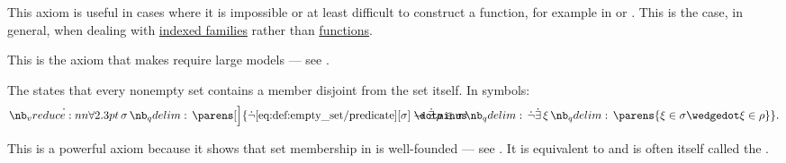 \begin{definition}
\begin{thmenum}
    This axiom is useful in cases where it is impossible or at least difficult to construct a function, for example in  or . This is the case, in general, when dealing with \hyperref[thm:zfc_existence_theorems/indexed_family]{indexed families} rather than \hyperref[def:function]{functions}.

    This is the axiom that makes  require large models --- see .

     The  states that every nonempty set contains a member disjoint from the set itself. In symbols:
    \begin{equation}\label{eq:def:zfc/foundation}
      \qforall \sigma \parens[\Big]
        {
          \synneg \ref{eq:def:empty_set/predicate}[\sigma]
          \synimplies
          \qexists {\rho \in \sigma} \synneg \qexists \xi \parens{ \xi \in \sigma \synwedge \xi \in \rho }
        }.
    \end{equation}

    This is a powerful axiom because it shows that set membership in  is well-founded --- see . It is equivalent to  and is often itself called the .
  \end{thmenum}
\end{definition}


